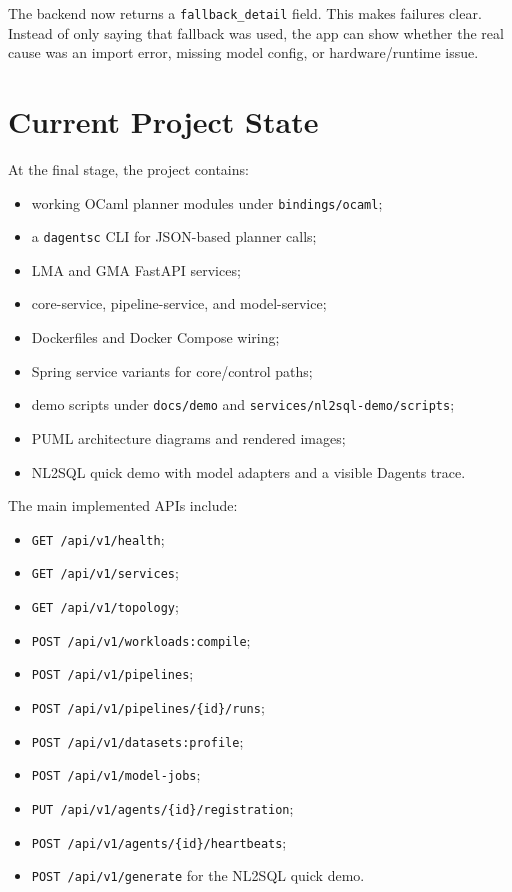 \documentclass[conference]{IEEEtran}
\begin{document}
The backend now returns a \texttt{fallback\_detail} field. This makes failures
clear. Instead of only saying that fallback was used, the app can show whether
the real cause was an import error, missing model config, or hardware/runtime
issue.

\section{Current Project State}

At the final stage, the project contains:

\begin{itemize}
  \item working OCaml planner modules under \texttt{bindings/ocaml};
  \item a \texttt{dagentsc} CLI for JSON-based planner calls;
  \item LMA and GMA FastAPI services;
  \item core-service, pipeline-service, and model-service;
  \item Dockerfiles and Docker Compose wiring;
  \item Spring service variants for core/control paths;
  \item demo scripts under \texttt{docs/demo} and \texttt{services/nl2sql-demo/scripts};
  \item PUML architecture diagrams and rendered images;
  \item NL2SQL quick demo with model adapters and a visible Dagents trace.
\end{itemize}

The main implemented APIs include:

\begin{itemize}
  \item \texttt{GET /api/v1/health};
  \item \texttt{GET /api/v1/services};
  \item \texttt{GET /api/v1/topology};
  \item \texttt{POST /api/v1/workloads:compile};
  \item \texttt{POST /api/v1/pipelines};
  \item \texttt{POST /api/v1/pipelines/\{id\}/runs};
  \item \texttt{POST /api/v1/datasets:profile};
  \item \texttt{POST /api/v1/model-jobs};
  \item \texttt{PUT /api/v1/agents/\{id\}/registration};
  \item \texttt{POST /api/v1/agents/\{id\}/heartbeats};
  \item \texttt{POST /api/v1/generate} for the NL2SQL quick demo.
\end{itemize}
\end{document}
